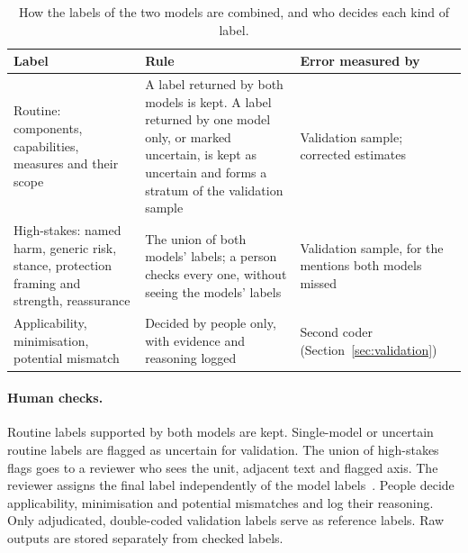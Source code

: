 \begin{table}[H]
\centering
\begin{singlespace}
\caption[How the labels of the two models are combined]{How the labels of the two models
are combined, and who decides each kind of label.}
\label{tab:llm-routing}
\footnotesize
\begin{tabularx}{\textwidth}{@{}>{\raggedright\arraybackslash}p{3.3cm}>{\raggedright\arraybackslash}X>{\raggedright\arraybackslash}p{3.6cm}@{}}
\toprule
\textbf{Label} & \textbf{Rule} & \textbf{Error measured by} \\
\midrule
Routine: components, capabilities, measures and their scope
  & A label returned by both models is kept. A label returned by one model only, or marked uncertain, is kept as uncertain and forms a stratum of the validation sample
  & Validation sample; corrected estimates \\
\cmidrule[0.3pt]{2-3}
High-stakes: named harm, generic risk, stance, protection framing and strength, reassurance
  & The union of both models' labels; a person checks every one, without seeing the models' labels
  & Validation sample, for the mentions both models missed \\
\cmidrule[0.3pt]{2-3}
Applicability, minimisation, potential mismatch
  & Decided by people only, with evidence and reasoning logged
  & Second coder (Section~\ref{sec:validation}) \\
\bottomrule
\end{tabularx}
\end{singlespace}
\end{table}

\paragraph{Human checks.} Routine labels supported by both models are kept. Single-model or
uncertain routine labels are flagged as uncertain for validation. The union of high-stakes flags
goes to a reviewer who sees the unit, adjacent text and flagged axis. The reviewer assigns the
final label independently of the model labels~\parencite{schroeder2025just}. People decide
applicability, minimisation and potential mismatches and log their reasoning. Only adjudicated,
double-coded validation labels serve as reference labels. Raw outputs are stored separately from
checked labels.

